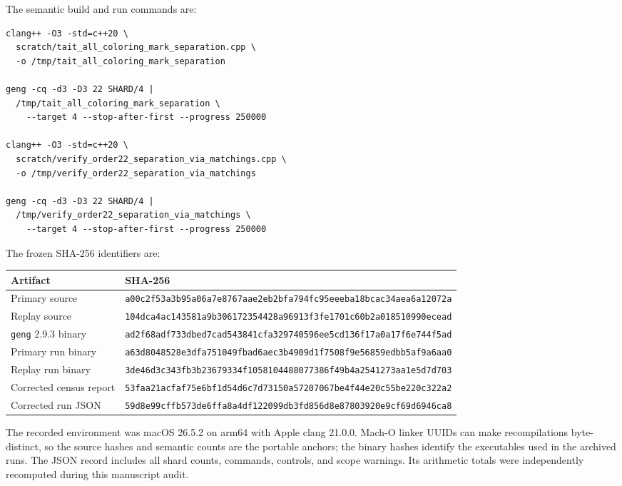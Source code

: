 \documentclass[11pt]{article}
\theoremstyle{definition}
\theoremstyle{remark}
\begin{document}
The semantic build and run commands are:
\begin{verbatim}
clang++ -O3 -std=c++20 \
  scratch/tait_all_coloring_mark_separation.cpp \
  -o /tmp/tait_all_coloring_mark_separation

geng -cq -d3 -D3 22 SHARD/4 |
  /tmp/tait_all_coloring_mark_separation \
    --target 4 --stop-after-first --progress 250000

clang++ -O3 -std=c++20 \
  scratch/verify_order22_separation_via_matchings.cpp \
  -o /tmp/verify_order22_separation_via_matchings

geng -cq -d3 -D3 22 SHARD/4 |
  /tmp/verify_order22_separation_via_matchings \
    --target 4 --stop-after-first --progress 250000
\end{verbatim}

The frozen SHA-256 identifiers are:
\begin{center}
\small
\begin{tabularx}{\textwidth}{@{}lX@{}}
\toprule
Artifact & SHA-256\\
\midrule
Primary source &
\texttt{a00c2f53a3b95a06a7e8767aae2eb2bfa794fc95eeeba18bcac34aea6a12072a}\\
Replay source &
\texttt{104dca4ac143581a9b306172354428a96913f3fe1701c60b2a018510990ecead}\\
\texttt{geng} 2.9.3 binary &
\texttt{ad2f68adf733dbed7cad543841cfa329740596ee5cd136f17a0a17f6e744f5ad}\\
Primary run binary &
\texttt{a63d8048528e3dfa751049fbad6aec3b4909d1f7508f9e56859edbb5af9a6aa0}\\
Replay run binary &
\texttt{3de46d3c343fb3b23679334f1058104488077386f49b4a2541273aa1e5d7d703}\\
Corrected census report &
\texttt{53faa21acfaf75e6bf1d54d6c7d73150a57207067be4f44e20c55be220c322a2}\\
Corrected run JSON &
\texttt{59d8e99cffb573de6ffa8a4df122099db3fd856d8e87803920e9cf69d6946ca8}\\
\bottomrule
\end{tabularx}
\end{center}

The recorded environment was macOS 26.5.2 on arm64 with Apple clang
21.0.0.  Mach-O linker UUIDs can make recompilations byte-distinct, so
the source hashes and semantic counts are the portable anchors; the
binary hashes identify the executables used in the archived runs.
The JSON record includes all shard counts, commands, controls, and scope
warnings.  Its arithmetic totals were independently recomputed during
this manuscript audit.
\end{document}

